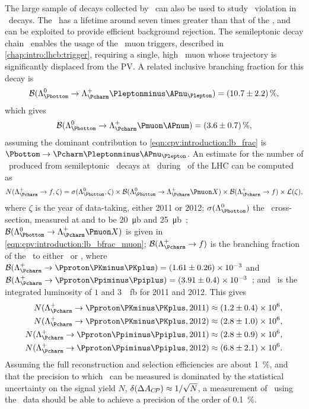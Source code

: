 The large sample of \PB decays collected by \lhcb\ can also be used to study 
\CP\ violation in \PLambdac\ decays.
The \PLambdab\ has a lifetime around seven times greater than that of the 
\PLambdac, and can be exploited to provide efficient background rejection.
The semileptonic decay chain \LbToLcmuX\ enables the usage of the \lhcb\ muon 
triggers, described in \cref{chap:intro:lhcb:trigger}, requiring a single, high 
\pT\ muon whose trajectory is significantly displaced from the \ac{PV}.
A related inclusive branching fraction for this decay is~\cite{PDG2014}
\begin{equation}
  \bfrac(\decay{\PLambdab}{\PLambdac\Pleptonminus\APnu_{\Plepton}}) =
    \SI{10.7 \pm 2.2}{\percent},
  \label{eqn:cpv:introduction:lb_bfrac}
\end{equation}
which gives
\begin{equation}
  \bfrac(\decay{\PLambdab}{\PLambdac\Pmuon\APnum}) =
    \SI{3.6 \pm 0.7}{\percent},
  \label{eqn:cpv:introduction:lb_bfrac_muon}
\end{equation}
assuming the dominant contribution to \cref{eqn:cpv:introduction:lb_frac} is 
$\decay{\Pbottom}{\Pcharm\Pleptonminus\APnu_{\Plepton}}$.
An estimate for the number of \LcTophh\ produced from semileptonic \PLambdab\ 
decays at \lhcb\ during \runone\ of the \ac{LHC} can be computed as
\begin{equation}
  N(\LcTof, \zeta) =
    \xsec(\PLambdab, \zeta)\times
    \bfrac(\LbToLcmuX)\times
    \bfrac(\LcTof)\times
    \lumi(\zeta),
\end{equation}
where $\zeta$ is the year of data-taking, either 2011 or 2012; 
$\xsec(\PLambdab)$ the \PLambdab\ cross-section, measured at  and 
\sqrtseq{8} to be \SI{20}{\micro\barn} and 
\SI{25}{\micro\barn}~\cite{Aaij:2015fea}; $\bfrac(\LbToLcmuX)$ is given in 
\cref{eqn:cpv:introduction:lb_bfrac_muon}; $\bfrac(\LcTof)$ is the branching 
fraction of the \PLambdac\ to either \pKK\ or \ppipi, where $\bfrac(\LcTopKK) = 
(1.61 \pm 0.26)\times 10^{-3}$ and $\bfrac(\LcToppipi) = (3.91 \pm 0.4)\times 
10^{-3}$~\cite{Ablikim:2016tze}; and \lumi\ is the integrated luminosity of $1$ 
and \SI{3}{\per\femto\barn} for 2011 and 2012.
This gives
\begin{align}
  N(\LcTopKK, 2011) &\approx (1.2 \pm 0.4) \times 10^{6},\nonumber\\
  N(\LcTopKK, 2012) &\approx (2.8 \pm 1.0) \times 10^{6},\nonumber\\
  N(\LcToppipi, 2011) &\approx (2.8 \pm 0.9) \times 10^{6},\nonumber\\
  N(\LcToppipi, 2012) &\approx (6.8 \pm 2.1) \times 10^{6}.
\end{align}
Assuming the full reconstruction and selection efficiencies are about 
\SI{1}{\percent}, and that the precision to which \dACP\ can be measured is 
dominated by the statistical uncertainty on the signal yield $N$, $\delta(\Delta A_{C\!P}) 
\approx 1/\sqrt{N}$, a measurement of \dACP\ using the \runone\ data should be 
able to achieve a precision of the order of \SI{0.1}{\percent}.

